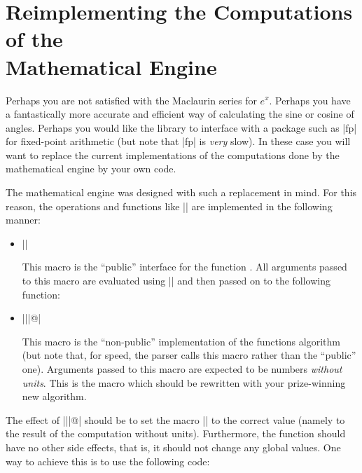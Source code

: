 %
%
%


\section[Reimplementing the Computations of the Mathematical Engine]
  {Reimplementing the Computations of the\\ Mathematical Engine}

\label{pgfmath-reimplement}

Perhaps you are not satisfied with the Maclaurin series for
$e^x$. Perhaps you have a fantastically more accurate
and efficient way of calculating the sine or cosine of angles. Perhaps
 you would like the library to interface with a package such as |fp| 
 for fixed-point arithmetic (but note that |fp| is \emph{very} slow).
In these case you will want to replace the current implementations of
the computations done by the mathematical engine by your own code. 

The mathematical engine was designed with such a replacement in
mind. For this reason, the operations and functions like |\pgfmathadd|
are implemented in the following manner: 

\begin{itemize}
\item |\pgfmath| 

  This macro is the ``public'' interface for the function
  . All arguments passed to this macro are 
  evaluated using |\pgfmathparse| and then passed on to the following
  function:
  
\item |\pgfmath||@|
  
  This macro is the ``non-public'' implementation of the functions 
  algorithm (but note that, for speed, the parser calls this macro 
  rather than the ``public'' one). Arguments passed to this macro 
  are expected to be numbers \emph{without units}. This is the macro 
  which should be rewritten with your prize-winning new algorithm.
	
\end{itemize}

The effect of |\pgfmath||@| should be to set the
macro |\pgfmathresult| to the correct value (namely to the result of
the computation without units). Furthermore, the function should have
no other side effects, that is, it should not change any global
values. One way to achieve this is to use the following code:

